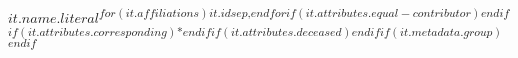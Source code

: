 $it.name.literal$\textsuperscript{$for(it.affiliations)$$it.id$$sep$,$endfor$$if(it.attributes.equal-contributor)$\Yinyang$endif$$if(it.attributes.corresponding)$*$endif$$if(it.attributes.deceased)$\dag$endif$$if(it.metadata.group)$\textpilcrow$endif$}

